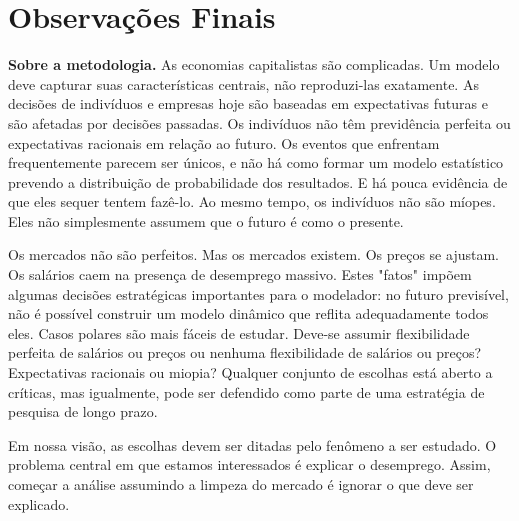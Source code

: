 \documentclass[12pt]{article}
\begin{document}
\section*{Observações Finais}

\textbf{Sobre a metodologia.} As economias capitalistas são complicadas. Um modelo deve capturar suas características centrais, não reproduzi-las exatamente. As decisões de indivíduos e empresas hoje são baseadas em expectativas futuras e são afetadas por decisões passadas. Os indivíduos não têm previdência perfeita ou expectativas racionais em relação ao futuro. Os eventos que enfrentam frequentemente parecem ser únicos, e não há como formar um modelo estatístico prevendo a distribuição de probabilidade dos resultados. E há pouca evidência de que eles sequer tentem fazê-lo. Ao mesmo tempo, os indivíduos não são míopes. Eles não simplesmente assumem que o futuro é como o presente.

Os mercados não são perfeitos. Mas os mercados existem. Os preços se ajustam. Os salários caem na presença de desemprego massivo. Estes "fatos" impõem algumas decisões estratégicas importantes para o modelador: no futuro previsível, não é possível construir um modelo dinâmico que reflita adequadamente todos eles. Casos polares são mais fáceis de estudar. Deve-se assumir flexibilidade perfeita de salários ou preços ou nenhuma flexibilidade de salários ou preços? Expectativas racionais ou miopia? Qualquer conjunto de escolhas está aberto a críticas, mas igualmente, pode ser defendido como parte de uma estratégia de pesquisa de longo prazo.

Em nossa visão, as escolhas devem ser ditadas pelo fenômeno a ser estudado. O problema central em que estamos interessados é explicar o desemprego. Assim, começar a análise assumindo a limpeza do mercado é ignorar o que deve ser explicado.
\end{document}
